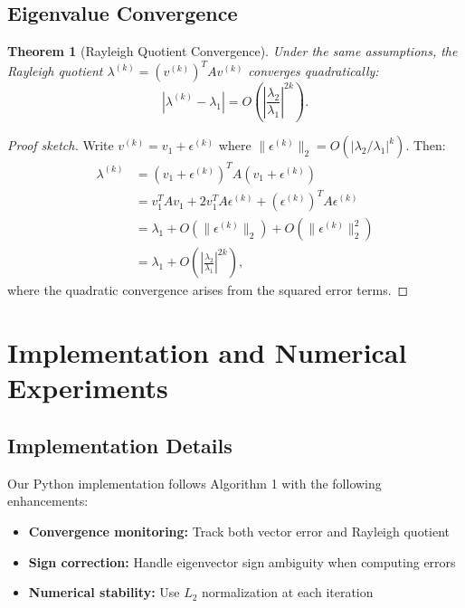 \documentclass[11pt,a4paper]{article}
\newtheorem{theorem}{Theorem}
\begin{document}
\subsection{Eigenvalue Convergence}

\begin{theorem}[Rayleigh Quotient Convergence]
Under the same assumptions, the Rayleigh quotient $\lambda^{(k)} = (v^{(k)})^T A v^{(k)}$ converges quadratically:
\begin{equation}
|\lambda^{(k)} - \lambda_1| = O\left(\left|\frac{\lambda_2}{\lambda_1}\right|^{2k}\right).
\end{equation}
\end{theorem}

\begin{proof}[Proof sketch]
Write $v^{(k)} = v_1 + \epsilon^{(k)}$ where $\|\epsilon^{(k)}\|_2 = O(|\lambda_2/\lambda_1|^k)$. Then:
\begin{align}
\lambda^{(k)} &= (v_1 + \epsilon^{(k)})^T A (v_1 + \epsilon^{(k)}) \\
&= v_1^T A v_1 + 2v_1^T A \epsilon^{(k)} + (\epsilon^{(k)})^T A \epsilon^{(k)} \\
&= \lambda_1 + O(\|\epsilon^{(k)}\|_2) + O(\|\epsilon^{(k)}\|_2^2) \\
&= \lambda_1 + O\left(\left|\frac{\lambda_2}{\lambda_1}\right|^{2k}\right),
\end{align}
where the quadratic convergence arises from the squared error terms.
\end{proof}

\section{Implementation and Numerical Experiments}

\subsection{Implementation Details}

Our Python implementation follows Algorithm 1 with the following enhancements:
\begin{itemize}
    \item \textbf{Convergence monitoring:} Track both vector error and Rayleigh quotient
    \item \textbf{Sign correction:} Handle eigenvector sign ambiguity when computing errors
    \item \textbf{Numerical stability:} Use $L_2$ normalization at each iteration
\end{itemize}
\end{document}
